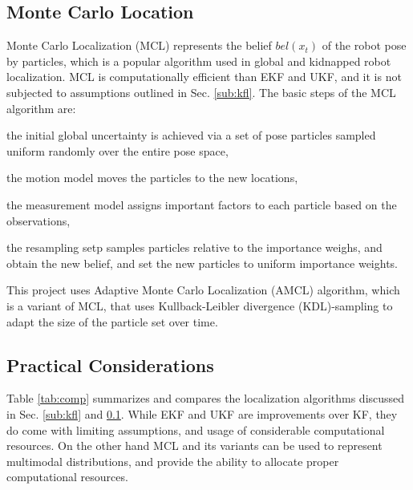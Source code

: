 \documentclass[10pt,journal,compsoc]{IEEEtran}
\begin{document}
\subsection{Monte Carlo Location}
\label{sub:mcl}

Monte Carlo Localization (MCL) represents the belief $bel(x_t)$ of the robot pose by particles, which is a popular algorithm used in global and kidnapped robot localization.  MCL is computationally efficient than EKF and UKF, and it is not subjected to assumptions outlined in Sec. \ref{sub:kfl}. The basic steps of the MCL algorithm are:   \begin{enumerate*} \item the initial global uncertainty is achieved via a set of pose particles sampled uniform randomly over the entire pose space, \item the motion model moves the particles to the new locations, \item the measurement model assigns important factors to each particle based on the observations, \item the resampling setp samples particles relative to the importance weighs, and obtain the new belief, and set the new particles to uniform importance weights.  \end{enumerate*}

This project uses Adaptive Monte Carlo Localization  (AMCL) algorithm, which is a variant of MCL, that uses Kullback-Leibler divergence (KDL)-sampling to adapt the size of the particle set over time. 

\subsection{Practical Considerations}

Table \ref{tab:comp} summarizes and compares the localization algorithms discussed in Sec. \ref{sub:kfl} and \ref{sub:mcl}. While EKF and UKF are improvements over KF, they do come with limiting assumptions, and usage of considerable computational resources. On the other hand MCL and its variants can be used to represent multimodal distributions, and provide the ability to allocate proper computational resources.    
\end{document}
